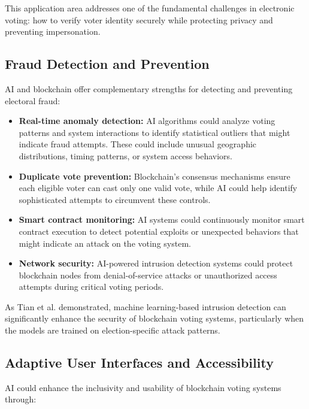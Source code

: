 \documentclass[conference]{IEEEtran}
\begin{document}
This application area addresses one of the fundamental challenges in electronic voting: how to verify voter identity securely while protecting privacy and preventing impersonation.

\subsection{Fraud Detection and Prevention}
AI and blockchain offer complementary strengths for detecting and preventing electoral fraud:

\begin{itemize}
    \item \textbf{Real-time anomaly detection:} AI algorithms could analyze voting patterns and system interactions to identify statistical outliers that might indicate fraud attempts. These could include unusual geographic distributions, timing patterns, or system access behaviors.
    
    \item \textbf{Duplicate vote prevention:} Blockchain's consensus mechanisms ensure each eligible voter can cast only one valid vote, while AI could help identify sophisticated attempts to circumvent these controls.
    
    \item \textbf{Smart contract monitoring:} AI systems could continuously monitor smart contract execution to detect potential exploits or unexpected behaviors that might indicate an attack on the voting system.
    
    \item \textbf{Network security:} AI-powered intrusion detection systems could protect blockchain nodes from denial-of-service attacks or unauthorized access attempts during critical voting periods.
\end{itemize}

As Tian et al. \cite{b14} demonstrated, machine learning-based intrusion detection can significantly enhance the security of blockchain voting systems, particularly when the models are trained on election-specific attack patterns.

\subsection{Adaptive User Interfaces and Accessibility}
AI could enhance the inclusivity and usability of blockchain voting systems through:
\end{document}
